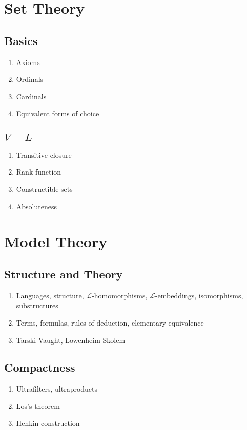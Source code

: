 \documentclass{article}
\begin{document}
\section{Set Theory}
\subsection{Basics} 
\begin{enumerate}
  \item Axioms
  \item Ordinals
  \item Cardinals
  \item Equivalent forms of choice
\end{enumerate}

\subsection{$V=L$} 
\begin{enumerate}
  \item Transitive closure
  \item Rank function
  \item Constructible sets
  \item Absoluteness
\end{enumerate}

\section{Model Theory}
\subsection{Structure and Theory} 
\begin{enumerate}
  \item Languages, structure, $\mathcal{L}$-homomorphisms,
    $\mathcal{L}$-embeddings, isomorphisms, substructures
  \item Terms, formulas, rules of deduction, elementary equivalence
  \item Tarski-Vaught, Lowenheim-Skolem
\end{enumerate}

\subsection{Compactness} 
\begin{enumerate}
  \item Ultrafilters, ultraproducts
  \item Los's theorem
  \item Henkin construction
\end{enumerate}
\end{document}
